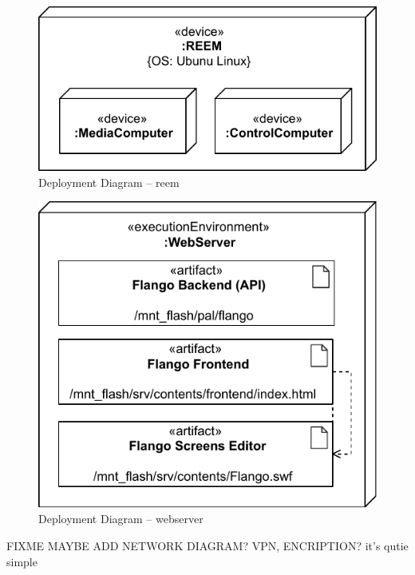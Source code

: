 \begin{figure}[htb]
    \centering
    \includegraphics{figures/design-deployment-reem.pdf}
    \caption{Deployment Diagram -- reem}
    \label{fig:deploy-reem}
\end{figure}

\begin{figure}[htb]
    \centering
    \includegraphics{figures/design-deployment-webserver.pdf}
    \caption{Deployment Diagram -- webserver}
    \label{fig:deploy-webserver}
\end{figure}

\FloatBarrier

FIXME MAYBE ADD NETWORK DIAGRAM? VPN, ENCRIPTION? it's qutie simple